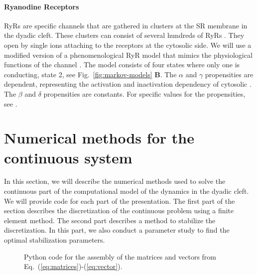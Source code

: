 \paragraph*{Ryanodine Receptors}
\label{sec:ryr}
RyRs are \Ca specific channels that are gathered in clusters at the SR membrane in the dyadic cleft. These clusters can consist of several hundreds of RyRs \cite{BeuckelmannWier1988,Franzini-ArmstrongProtasiEtAl1999}. They open by single \Ca ions attaching to the receptors at the cytosolic side. We will use a modified version of a phenomenological RyR model that mimics the physiological functions of the channel \cite{SternSongChengEtAl1999}. The model consists of four states where only one is conducting, state 2, see Fig.~\ref{fig:markov-models} \textbf{B}. The $\alpha$ and $\gamma$ propensities are \Ca dependent, representing the activation and inactivation dependency of cytosolic \CaC. The $\beta$ and $\delta$ propensities are constants. For specific values for the propensities, see \citet{SternSongChengEtAl1999}.\par

\section{Numerical methods for the continuous system}
In this section, we will describe the numerical methods used to solve the continuous part of the computational model of the \Ca dynamics in the dyadic cleft. We will provide \pydolfin code for each part of the presentation. The first part of the section describes the discretization of the continuous problem using a finite element method. The second part describes a method to stabilize the discretization. In this part, we also conduct a parameter study to find the optimal stabilization parameters.\par
\begin{figure}
  \centering
  \vspace{-1.5em}
  \caption{Python code for the assembly of the matrices and vectors from Eq.~(\ref{eq:matrices})-(\ref{eq:vector}).}
  \label{fig:assembly-algorithm}
\end{figure}

